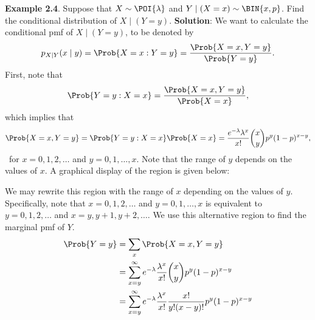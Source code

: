 \begin{Example}
    \textbf{Example 2.4}. Suppose that $ X \sim \POI{\lambda} $ and $ Y\mid(X=x)\sim \BIN{x,p} $. Find the conditional distribution of $ X\mid(Y=y) $.
    \tcblower{}
    \textbf{Solution}: We want to calculate the conditional pmf of $ X\mid(Y=y) $, to be denoted by
    \[ p_{X\mid Y}(x\mid y)=\Prob{X=x\given Y=y}=\frac{\Prob{X=x,Y=y}}{\Prob{Y=y}}. \]
    First, note that
    \[ \Prob{Y=y\given X=x}=\frac{\Prob{X=x,Y=y}}{\Prob{X=x}}, \]
    which implies that
    \[ \Prob{X=x,Y=y}=\Prob{Y=y\given X=x}\Prob{X=x}=\frac{e^{-\lambda}\lambda^x}{x!}\binom{x}{y}p^y(1-p)^{x-y},  \]\
    for $x=0,1,2,\ldots$ and $y=0,1,\ldots,x$.
    Note that the range of $ y $ depends on the values of $ x $. A graphical display of the region is given below:
    \begin{center}
    \end{center}
    We may rewrite this region with the range of $ x $ depending on the values of $ y $. Specifically, note that $ x=0,1,2,\ldots $ and $ y=0,1,\ldots,x $
    is equivalent to $ y=0,1,2,\ldots $ and $ x=y,y+1,y+2,\ldots $. We use this alternative region to find the marginal pmf of $ Y $.
    \begin{align*}
        \Prob{Y=y}
         & =\sum_x\Prob{X=x,Y=y}                                                                                                                \\
         & =\sum_{x=y}^{\infty} e^{-\lambda}\frac{\lambda^x}{x!} \binom{x}{y}p^y(1-p)^{x-y}                                                     \\
         & =\sum_{x=y}^{\infty} e^{-\lambda}\frac{\lambda^x}{x!} \frac{x!}{y!(x-y)!} p^y(1-p)^{x-y}                                             \\

\end{align*}
\end{Example}
